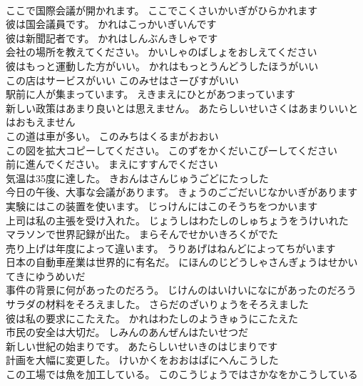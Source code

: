 \documentclass[8pt]{extreport}
\begin{document}
\begin{CJK}{UTF8}{min}
\\	ここで国際会議が開かれます。	ここでこくさいかいぎがひらかれます 
\\	彼は国会議員です。	かれはこっかいぎいんです 
\\	彼は新聞記者です。	かれはしんぶんきしゃです 
\\	会社の場所を教えてください。	かいしゃのばしょをおしえてください 
\\	彼はもっと運動した方がいい。	かれはもっとうんどうしたほうがいい 
\\	この店はサービスがいい	このみせはさーびすがいい 
\\	駅前に人が集まっています。	えきまえにひとがあつまっています 
\\	新しい政策はあまり良いとは思えません。	あたらしいせいさくはあまりいいとはおもえません 
\\	この道は車が多い。	このみちはくるまがおおい 
\\	この図を拡大コピーしてください。	このずをかくだいこぴーしてください 
\\	前に進んでください。	まえにすすんでください 
\\	気温は35度に達した。	きおんはさんじゅうごどにたっした 
\\	今日の午後、大事な会議があります。	きょうのごごだいじなかいぎがあります 
\\	実験にはこの装置を使います。	じっけんにはこのそうちをつかいます 
\\	上司は私の主張を受け入れた。	じょうしはわたしのしゅちょうをうけいれた 
\\	マラソンで世界記録が出た。	まらそんでせかいきろくがでた 
\\	売り上げは年度によって違います。	うりあげはねんどによってちがいます 
\\	日本の自動車産業は世界的に有名だ。	にほんのじどうしゃさんぎょうはせかいてきにゆうめいだ 
\\	事件の背景に何があったのだろう。	じけんのはいけいになにがあったのだろう 
\\	サラダの材料をそろえました。	さらだのざいりょうをそろえました 
\\	彼は私の要求にこたえた。	かれはわたしのようきゅうにこたえた 
\\	市民の安全は大切だ。	しみんのあんぜんはたいせつだ 
\\	新しい世紀の始まりです。	あたらしいせいきのはじまりです 
\\	計画を大幅に変更した。	けいかくをおおはばにへんこうした 
\\	この工場では魚を加工している。	このこうじょうではさかなをかこうしている 

\end{CJK}
\end{document}
